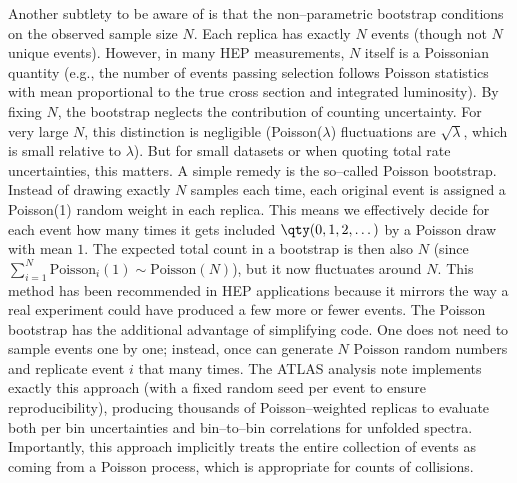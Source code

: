             Another subtlety to be aware of is that the non--parametric bootstrap conditions on the observed sample size $N$.
            Each replica has exactly $N$ events (though not $N$ unique events).
            However, in many HEP measurements, $N$ itself is a Poissonian quantity (e.g., the number of events passing selection follows Poisson statistics with mean proportional to the true cross section and integrated luminosity).
            By fixing $N$, the bootstrap neglects the contribution of counting uncertainty.
            For very large $N$, this distinction is negligible (Poisson($\lambda$) fluctuations are $\sqrt{\lambda}$, which is small relative to $\lambda$).
            But for small datasets or when quoting total rate uncertainties, this matters.
            A simple remedy is the so--called Poisson bootstrap.
            Instead of drawing exactly $N$ samples each time, each original event is assigned a Poisson(1) random weight in each replica.
            This means we effectively decide for each event how many times it gets included \(\qty(0, 1, 2,\dots)\) by a Poisson draw with mean \(1\).
            The expected total count in a bootstrap is then also $N$ (since $\sum_{i=1}^N \text{Poisson}_i(1) \sim \text{Poisson}(N)$), but it now fluctuates around $N$.
            This method has been recommended in HEP applications because it mirrors the way a real experiment could have produced a few more or fewer events.
            The Poisson bootstrap has the additional advantage of simplifying code.
            One does not need to sample events one by one;
            instead, once can generate $N$ Poisson random numbers and replicate event $i$ that many times.
            The ATLAS analysis note implements exactly this approach (with a fixed random seed per event to ensure reproducibility), producing thousands of Poisson--weighted replicas to evaluate both per bin uncertainties and bin--to--bin correlations for unfolded spectra.
            Importantly, this approach implicitly treats the entire collection of events as coming from a Poisson process, which is appropriate for counts of collisions.

